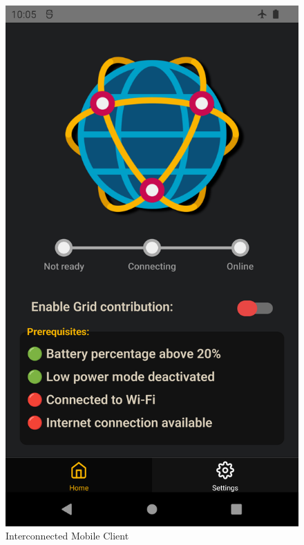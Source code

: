 \begin{figure}[!ht]
    \centering
    \includegraphics[scale=0.15]{document/chapters/chapter_7/images/interconnected_mobile_home.png}
    \caption{Interconnected Mobile Client}
    \label{fig:interconnected_mobile_home}
\end{figure}

